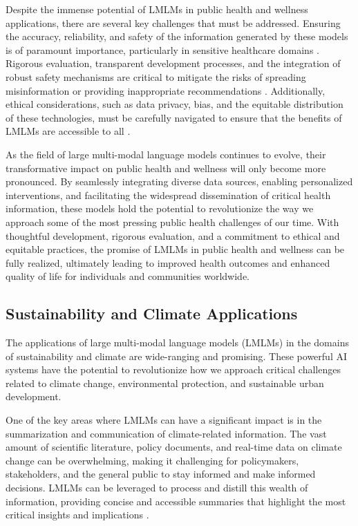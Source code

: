 \documentclass[11pt]{article}
\begin{document}
Despite the immense potential of LMLMs in public health and wellness applications, there are several key challenges that must be addressed. Ensuring the accuracy, reliability, and safety of the information generated by these models is of paramount importance, particularly in sensitive healthcare domains \cite{ref212}. Rigorous evaluation, transparent development processes, and the integration of robust safety mechanisms are critical to mitigate the risks of spreading misinformation or providing inappropriate recommendations \cite{ref213}. Additionally, ethical considerations, such as data privacy, bias, and the equitable distribution of these technologies, must be carefully navigated to ensure that the benefits of LMLMs are accessible to all \cite{ref214}.

As the field of large multi-modal language models continues to evolve, their transformative impact on public health and wellness will only become more pronounced. By seamlessly integrating diverse data sources, enabling personalized interventions, and facilitating the widespread dissemination of critical health information, these models hold the potential to revolutionize the way we approach some of the most pressing public health challenges of our time. With thoughtful development, rigorous evaluation, and a commitment to ethical and equitable practices, the promise of LMLMs in public health and wellness can be fully realized, ultimately leading to improved health outcomes and enhanced quality of life for individuals and communities worldwide.

\subsection{Sustainability and Climate Applications}

The applications of large multi-modal language models (LMLMs) in the domains of sustainability and climate are wide-ranging and promising. These powerful AI systems have the potential to revolutionize how we approach critical challenges related to climate change, environmental protection, and sustainable urban development.

One of the key areas where LMLMs can have a significant impact is in the summarization and communication of climate-related information. The vast amount of scientific literature, policy documents, and real-time data on climate change can be overwhelming, making it challenging for policymakers, stakeholders, and the general public to stay informed and make informed decisions. LMLMs can be leveraged to process and distill this wealth of information, providing concise and accessible summaries that highlight the most critical insights and implications \cite{ref215}.
\end{document}

